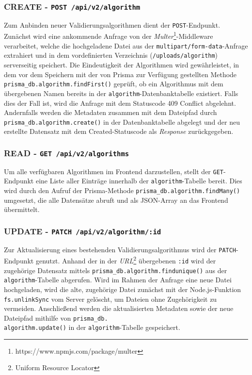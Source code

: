 \subsubsection*{CREATE - \texttt{POST /api/v2/algorithm}}

Zum Anbinden neuer Validierungsalgorithmen dient der \texttt{POST}-Endpunkt. Zunächst wird eine ankommende Anfrage von der \textit{Multer}\footnote{https://www.npmjs.com/package/multer}-Middleware verarbeitet, welche die hochgeladene Datei aus der \texttt{multipart/form-data}-Anfrage extrahiert und in dem vordefinierten Verzeichnis (\texttt{/uploads/algorithm}) serverseitig speichert. Die Eindeutigkeit der Algorithmen wird gewährleistet, in dem vor dem Speichern mit der von Prisma zur Verfügung gestellten Methode \texttt{prisma\_db.algorithm.findFirst()} geprüft, ob ein Algorithmus mit dem übergebenen Namen bereits in der \texttt{algorithm}-Datenbanktabelle existiert. Falls dies der Fall ist, wird die Anfrage mit dem Statuscode 409 Conflict abgelehnt. Andernfalls werden die Metadaten zusammen mit dem Dateipfad durch \texttt{prisma\_db.algorithm.create()} in der Datenbanktabelle abgelegt und der neu erstellte Datensatz mit dem Created-Statuscode als \textit{Response} zurückgegeben.

\subsubsection*{READ - \texttt{GET /api/v2/algorithms}}

Um alle verfügbaren Algorithmen im Frontend darzustellen, stellt der \texttt{GET}-Endpunkt eine Liste aller Einträge innerhalb der \texttt{algorithm}-Tabelle bereit. Dies wird durch den Aufruf der Prisma-Methode \texttt{prisma\_db.algorithm.findMany()} umgesetzt, die alle Datensätze abruft und als JSON-Array an das Frontend übermittelt.

\subsubsection*{UPDATE - \texttt{PATCH /api/v2/algorithm/:id}}

Zur Aktualisierung eines bestehenden Validierungsalgorithmus wird der \texttt{PATCH}-Endpunkt genutzt. Anhand der in der \textit{URL}\footnote{Uniform Resource Locator} übergebenen \texttt{:id} wird der zugehörige Datensatz mittels \texttt{prisma\_db.algorithm.findunique()} aus der \texttt{algorithm}-Tabelle abgerufen. Wird im Rahmen der Anfrage eine neue Datei hochgeladen, wird die alte, zugehörige Datei zunächst mit der Node.js-Funktion \texttt{fs.unlinkSync} vom Server gelöscht, um Dateien ohne Zugehörigkeit zu vermeiden. Anschließend werden die aktualisierten Metadaten sowie der neue Dateipfad mithilfe von \texttt{prisma\_db.\\ algorithm.update()} in der \texttt{algorithm}-Tabelle gespeichert.

